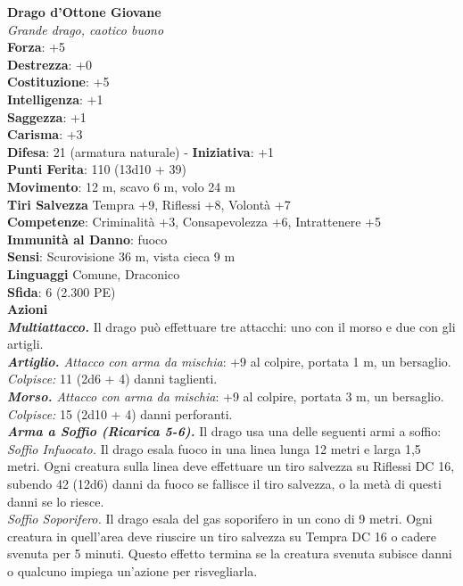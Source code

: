 \begin{multicols}{2}
\medskip\textbf{Drago d'Ottone Giovane}\\
\emph{Grande drago, caotico buono}\\
\textbf{Forza}: +5\\
\textbf{Destrezza}: +0\\
\textbf{Costituzione}: +5\\
\textbf{Intelligenza}: +1\\
\textbf{Saggezza}: +1\\
\textbf{Carisma}: +3\\
\textbf{Difesa}: 21 (armatura naturale) - \textbf{Iniziativa}: +1\\
\textbf{Punti Ferita}: 110 (13d10 + 39)\\
\textbf{Movimento}: 12 m, scavo 6 m, volo 24 m\\
\textbf{Tiri Salvezza} Tempra +9, Riflessi +8, Volontà +7\\
\textbf{Competenze}: Criminalità +3, Consapevolezza +6, Intrattenere +5\\
\textbf{Immunità al Danno}: fuoco\\
\textbf{Sensi}: Scurovisione 36 m, vista cieca 9 m\\
\textbf{Linguaggi} Comune, Draconico\\
\textbf{Sfida}: 6 (2.300 PE)\smallskip\\
\smallskip\textbf{Azioni}\\
\emph{\textbf{Multiattacco.}} Il drago può effettuare tre attacchi: uno con il morso e due con gli artigli.\\
\emph{\textbf{Artiglio.} Attacco con arma da mischia}: +9 al colpire, portata 1 m, un bersaglio.\\
\emph{Colpisce:} 11 (2d6 + 4) danni taglienti.\\
\emph{\textbf{Morso.} Attacco con arma da mischia}: +9 al colpire, portata 3 m, un bersaglio.\\
\emph{Colpisce:} 15 (2d10 + 4) danni perforanti.\\
\emph{\textbf{Arma a Soffio (Ricarica 5-6).}} Il drago usa una delle seguenti armi a soffio:\\
\emph{Soffio Infuocato.} Il drago esala fuoco in una linea lunga 12 metri e larga 1,5 metri. Ogni creatura sulla linea deve effettuare un tiro salvezza su Riflessi DC  16, subendo 42 (12d6) danni da fuoco se fallisce il tiro salvezza, o la metà di questi danni se lo riesce.\\
\emph{Soffio Soporifero.} Il drago esala del gas soporifero in un cono di 9 metri. Ogni creatura in quell'area deve riuscire un tiro salvezza su Tempra DC  16 o cadere svenuta per 5 minuti. Questo effetto termina se la creatura svenuta subisce danni o qualcuno impiega un'azione per risvegliarla.\\

\end{multicols}
